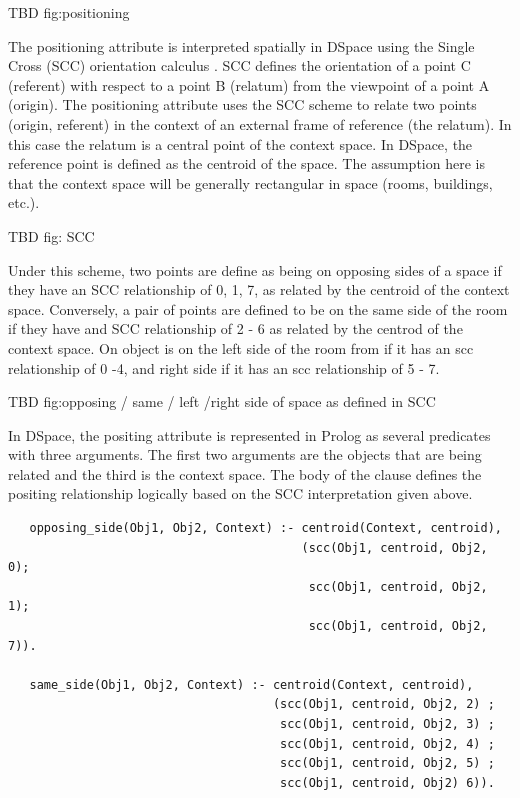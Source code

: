 \documentclass[12pt]{ucthesis}
\begin{document}
TBD fig:positioning 

The positioning attribute is interpreted spatially in DSpace using the Single Cross (SCC) orientation calculus \cite{Freksa}. SCC defines the orientation of a point C (referent) with respect to a point B (relatum) from the viewpoint of a point A (origin). The positioning attribute uses the SCC scheme to relate two points (origin, referent) in the context of an external frame of reference (the relatum). In this case the relatum is a central point of the context space. In DSpace, the reference point is defined as the centroid of the space. The assumption here is that the context space will be generally rectangular in space (rooms, buildings, etc.).

TBD fig: SCC

Under this scheme, two points are define as being on opposing sides of a space if they have an SCC relationship of 0, 1, 7, as related by the centroid of the context space. Conversely, a pair of points are defined to be on the same side of the room if they have and SCC relationship of 2 - 6 as related by the centrod of the context space. On object is on the left side of the room from if it has an scc relationship of 0 -4, and right side if it has an scc relationship of 5 - 7. 

TBD fig:opposing / same / left /right side of space as defined in SCC

In DSpace, the positing attribute is represented in Prolog as several predicates with three arguments. The first two arguments are the objects that are being related and the third is the context space. The body of the clause defines the positing relationship logically based on the SCC interpretation given above.

\begin{verbatim}
   opposing_side(Obj1, Obj2, Context) :- centroid(Context, centroid),
                                         (scc(Obj1, centroid, Obj2, 0);
                                          scc(Obj1, centroid, Obj2, 1);
                                          scc(Obj1, centroid, Obj2, 7)).
                                          
   same_side(Obj1, Obj2, Context) :- centroid(Context, centroid),
                                     (scc(Obj1, centroid, Obj2, 2) ;
                                      scc(Obj1, centroid, Obj2, 3) ;
                                      scc(Obj1, centroid, Obj2, 4) ;
                                      scc(Obj1, centroid, Obj2, 5) ;
                                      scc(Obj1, centroid, Obj2) 6)).   

\end{verbatim}
\end{document}
